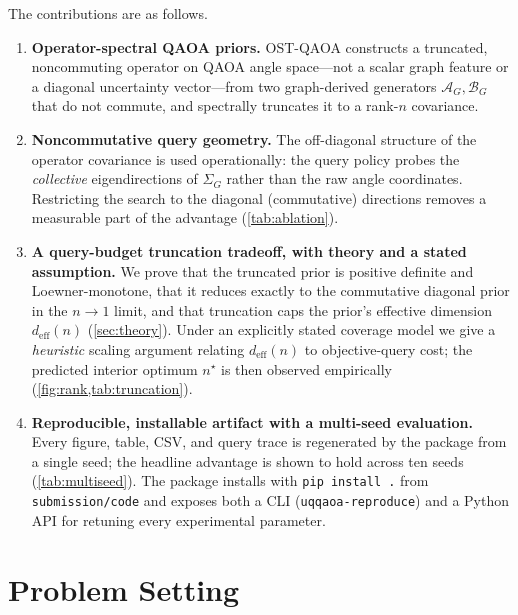 \documentclass[aps,prresearch,reprint,amsmath,amssymb,floatfix,nofootinbib,superscriptaddress,longbibliography]{revtex4-2}
\theoremstyle{remark}
\newcommand{\OSTQAOA}{\textnormal{\textsc{OST-QAOA}}}
\newcommand{\calA}{\mathcal{A}}
\newcommand{\calB}{\mathcal{B}}
\begin{document}
The contributions are as follows.
\begin{enumerate}
    \item \textbf{Operator-spectral QAOA priors.}  \OSTQAOA{} constructs a
    truncated, noncommuting operator on QAOA angle space---not a scalar graph
    feature or a diagonal uncertainty vector---from two graph-derived generators
    \(\calA_G,\calB_G\) that do not commute, and spectrally truncates it to a
    rank-\(n\) covariance.
    \item \textbf{Noncommutative query geometry.}  The off-diagonal structure of
    the operator covariance is used operationally: the query policy probes the
    \emph{collective} eigendirections of \(\Sigma_G\) rather than the raw angle
    coordinates.  Restricting the search to the diagonal (commutative)
    directions removes a measurable part of the advantage (\cref{tab:ablation}).
    \item \textbf{A query-budget truncation tradeoff, with theory and a stated
    assumption.}  We prove that the truncated prior is positive definite and
    Loewner-monotone, that it reduces exactly to the commutative diagonal prior in
    the \(n\to1\) limit, and that truncation caps the prior's effective dimension
    \(d_{\mathrm{eff}}(n)\) (\cref{sec:theory}).  Under an explicitly stated
    coverage model we give a \emph{heuristic} scaling argument relating
    \(d_{\mathrm{eff}}(n)\) to objective-query cost; the predicted interior
    optimum \(n^{\star}\) is then observed empirically
    (\cref{fig:rank,tab:truncation}).
    \item \textbf{Reproducible, installable artifact with a multi-seed
    evaluation.}  Every figure, table, CSV, and query trace is regenerated by the
    package from a single seed; the headline advantage is shown to hold across
    ten seeds (\cref{tab:multiseed}).  The package installs with \texttt{pip
    install .} from \texttt{submission/code} and exposes both a CLI
    (\texttt{uqqaoa-reproduce}) and a Python API for retuning every experimental
    parameter.
\end{enumerate}

\section{Problem Setting}
\end{document}
